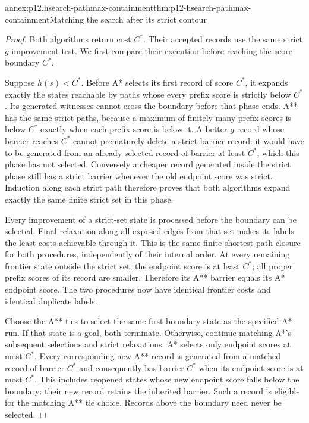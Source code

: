 \begin{annexitem}{annex:p12.hsearch-pathmax-containment}{thm:p12-hsearch-pathmax-containment}{Matching the search after its strict contour}
\begin{proof}
Both algorithms return cost \(C^*\). Their accepted records use the
same strict \(g\)-improvement test. We first compare their execution
before reaching the score boundary \(C^*\).

Suppose \(h(s)<C^*\). Before A* selects its first record of score
\(C^*\), it expands exactly the states reachable by paths whose
every prefix score is strictly below \(C^*\). Its generated
witnesses cannot cross the boundary before that phase ends. A** has the
same strict paths, because a maximum of finitely many prefix scores is
below \(C^*\) exactly when each prefix score is below it. A better
\(g\)-record whose barrier reaches \(C^*\) cannot prematurely
delete a strict-barrier record: it would have to be generated from an
already selected record of barrier at least \(C^*\), which this
phase has not selected. Conversely a cheaper record generated inside the
strict phase still has a strict barrier whenever the old endpoint score
was strict. Induction along each strict path therefore proves that both
algorithms expand exactly the same finite strict set in this phase.

Every improvement of a strict-set state is processed before the boundary
can be selected. Final relaxation along all exposed edges from that set
makes its labels the least costs achievable through it. This is the
same finite shortest-path closure for both procedures, independently of
their internal order. At every remaining frontier state outside the
strict set, the endpoint score is at least \(C^*\); all proper
prefix scores of its record are smaller. Therefore its A** barrier
equals its A* endpoint score. The two procedures now have identical
frontier costs and identical duplicate labels.

Choose the A** ties to select the same first boundary state as the
specified A* run. If that state is a goal, both terminate. Otherwise,
continue matching A*'s subsequent selections and strict relaxations.
A* selects only endpoint scores at most \(C^*\). Every corresponding
new A** record is generated from a matched record of barrier \(C^*\)
and consequently has barrier \(C^*\) when its endpoint score is
at most \(C^*\). This includes reopened states whose new endpoint
score falls below the boundary: their new record retains the inherited
barrier. Such a record is eligible for the matching A** tie choice.
Records above the boundary need never be selected.


\end{proof}
\end{annexitem}
